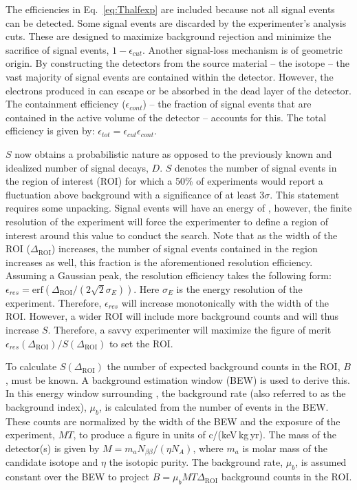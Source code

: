 The efficiencies in Eq.~\ref{eq:Thalfexp} are included because not all signal events can be detected. Some signal events are discarded by the experimenter's analysis cuts. These are designed to maximize background rejection and minimize the sacrifice of signal events, $1 - \epsilon_{cut}$. Another signal-loss mechanism is of geometric origin. By constructing the detectors from the source material -- the \novbb{} isotope -- the vast majority of signal events are contained within the detector. However, the electrons produced in \novbb{} can escape or be absorbed in the dead layer of the detector. The containment efficiency ($\epsilon_{cont}$) -- the fraction of signal events that are contained in the active volume of the detector -- accounts for this. The total efficiency is given by: $\epsilon_{tot}=\epsilon_{cut}\epsilon_{cont}$.

$S$ now obtains a probabilistic nature as opposed to the previously known and idealized number of signal decays, $D$. $S$ denotes the number of signal events in the \novbb{} region of interest (ROI) for which a 50\% of experiments would report a fluctuation above background with a significance of at least 3$\sigma$. This statement requires some unpacking. Signal events will have an energy of \Qbb{}, however, the finite resolution of the experiment will force the experimenter to define a region of interest around this value to conduct the search.  Note that as the width of the ROI ($\Delta_{\text{ROI}}$) increases, the number of signal events contained in the region increases as well, this fraction is the aforementioned resolution efficiency. Assuming a Gaussian \novbb{} peak, the resolution efficiency takes the following form: $\epsilon_{res} = \text{erf}(\Delta_{\text{ROI}}/(2\sqrt2\sigma_E))$.  Here $\sigma_E$ is the energy resolution of the experiment. Therefore, $\epsilon_{res}$ will increase monotonically with the width of the ROI. However, a wider ROI will include more background counts and will thus increase $S$. Therefore, a savvy experimenter will maximize the figure of merit $\epsilon_{res}(\Delta_{\text{ROI}})/S(\Delta_{\text{ROI}})$ to set the ROI.

To calculate $S(\Delta_{\text{ROI}})$ the number of expected background counts in the ROI, $B$, must be known. A background estimation window (BEW) is used to derive this. In this energy window surrounding \Qbb{}, the background rate (also referred to as the background index), $\mu_b$, is calculated from the number of events in the BEW. These counts are normalized by the width of the BEW and the exposure of the experiment, $MT$, to produce a figure in units of c/(keV\,kg\,yr). The mass of the detector(s) is given by $M =  m_aN_{\beta\beta}/(\eta N_A)$, where $m_a$ is molar mass of the candidate isotope and $\eta$ the isotopic purity. The background rate, $\mu_b$, is assumed constant over the BEW to project $B = \mu_bMT\Delta_{\text{ROI}}$ background counts in the ROI.

